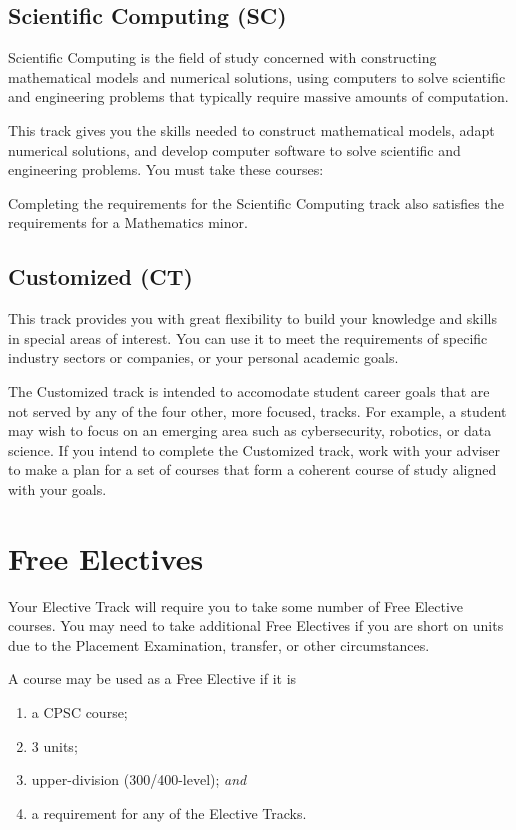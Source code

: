 \documentclass{book}
\begin{document}
\subsection{Scientific Computing (SC)}

Scientific Computing is the field of study concerned with constructing mathematical models and numerical solutions, using computers to solve scientific and engineering problems that typically require massive amounts of computation.

This track gives you the skills needed to construct mathematical models, adapt numerical solutions, and develop computer software to solve scientific and engineering problems. You must take these courses:

Completing the requirements for the Scientific Computing track also satisfies the requirements for a Mathematics minor.

\subsection{Customized (CT)}

This track provides you with great flexibility to build your knowledge and skills in special areas of interest. You can use it to meet the requirements of specific industry sectors or companies, or your personal academic goals.

The Customized track is intended to accomodate student career goals that are not served by any of the four other, more focused, tracks. For example, a student may wish to focus on an emerging area such as cybersecurity, robotics, or data science. If you intend to complete the Customized track, work with your adviser to make a plan for a set of courses that form a coherent course of study aligned with your goals.

\section{Free Electives}
\label{section:free_electives}

Your Elective Track will require you to take some number of Free Elective courses. You may need to take additional Free Electives if you are short on units due to the Placement Examination, transfer, or other circumstances.

A course may be used as a Free Elective if it is
\begin{enumerate}
\item a CPSC course;
\item 3 units;
\item upper-division (300/400-level); \emph{and}
\item a requirement for any of the Elective Tracks.
\end{enumerate}
\end{document}
